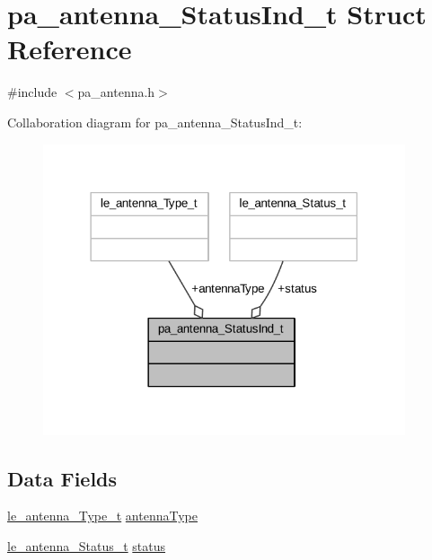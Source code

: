 \hypertarget{structpa__antenna___status_ind__t}{}\section{pa\+\_\+antenna\+\_\+\+Status\+Ind\+\_\+t Struct Reference}
\label{structpa__antenna___status_ind__t}


{\ttfamily \#include $<$pa\+\_\+antenna.\+h$>$}



Collaboration diagram for pa\+\_\+antenna\+\_\+\+Status\+Ind\+\_\+t\+:
\nopagebreak
\begin{figure}[H]
\begin{center}
\leavevmode
\includegraphics[width=302pt]{structpa__antenna___status_ind__t__coll__graph}
\end{center}
\end{figure}
\subsection*{Data Fields}
\begin{DoxyCompactItemize}
\item 
\hyperlink{le__antenna__interface_8h_a1ec9df90396295a1d47f0f2940c13c70}{le\+\_\+antenna\+\_\+\+Type\+\_\+t} \hyperlink{structpa__antenna___status_ind__t_added82300912752c6c4ae49c25b655e2}{antenna\+Type}
\item 
\hyperlink{le__antenna__interface_8h_a78674a68c062ffc7625954391f1ec98f}{le\+\_\+antenna\+\_\+\+Status\+\_\+t} \hyperlink{structpa__antenna___status_ind__t_a27036cb48db59c18aaf6d920632ce169}{status}
\end{DoxyCompactItemize}


